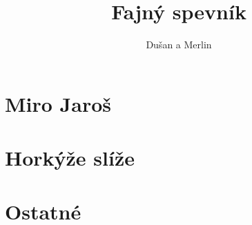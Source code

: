 \documentclass[a4paper]{article}
\title{Fajný spevník}
\author{Dušan a Merlin}
\date{}
\begin{document}
\maketitle
\clearpage
\tableofcontents
\clearpage
\begin{multicols}{3}

\section{Miro Jaroš}
    
    
    
    

\section{Horkýže slíže}

\section{Ostatné}
    
    



\end{multicols}
\end{document}

